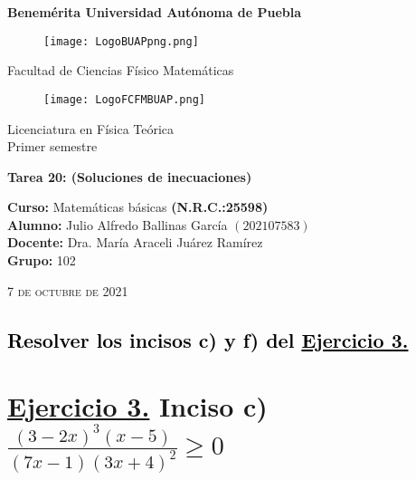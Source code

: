 \documentclass[12pt]{article}
\begin{document}
\pagestyle{empty} 
\setlength{\parindent}{0pt}
\sffamily
\begin{center} \LARGE{\bf Benemérita Universidad Autónoma de Puebla} \\[0.5cm]
\begin{figure}[htb] \centering \texttt{[image: LogoBUAPpng.png]} \end{figure}
\LARGE{Facultad de Ciencias Físico Matemáticas}\\[0.5cm]
\begin{figure}[htb] \centering \texttt{[image: LogoFCFMBUAP.png]} \end{figure} 
\Large{Licenciatura en Física Teórica}\\[0.5cm]
\large{Primer semestre} \end{center}
\begin{center} { \Large \bfseries{Tarea 20}: (Soluciones de inecuaciones)} \\ \end{center}
\large{\bf Curso:} Matemáticas básicas \textbf{(N.R.C.:25598)}\\
\large{\bf Alumno:} Julio Alfredo Ballinas García $\left(202107583\right)$ \\
\large{\bf Docente:} Dra. María Araceli Juárez Ramírez\\
\large{\bf Grupo:} 102\\ \begin{center} 
\vfill
\textsc{7 de octubre de 2021} \end{center}

\newpage
\begin{center}

{\section*{\LARGE{\textcolor{black}{Resolver los incisos {\textcolor{pakistangreen}{c)}} y {\textcolor{palatinateblue}{f)}} del {\textcolor{wildwatermelon}{\underline{Ejercicio 3.}}}}}}}\end{center} \vspace{2.2cm}

\section{{\textcolor{wildwatermelon}{{\underline{Ejercicio 3.}}}} Inciso {\textcolor{pakistangreen}{c)}} {\LARGE{$\frac{(3-2x)^{3} (x-5)}{(7x-1) (3x+4)^{2}} \geq 0$ {\blue{$^{+}$}}}}} \vspace{.6cm}
\end{document}
